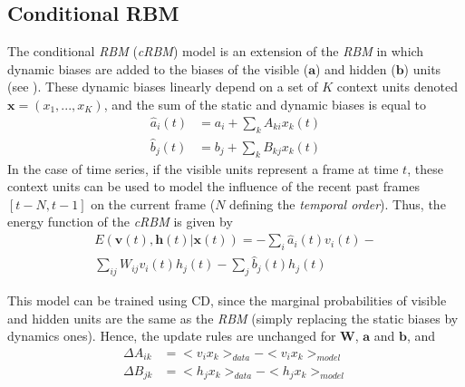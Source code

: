\documentclass[letterpaper]{article}
\begin{document}
\subsection{Conditional RBM}
The conditional \textit{RBM} (\textit{cRBM}) model \cite{taylor2009factored} is an extension of the \textit{RBM} in which dynamic biases are added to the biases of the visible ($\bm{a}$) and hidden ($\bm{b}$) units (see ). These dynamic biases linearly depend on a set of $K$ context units denoted $\bm{x} = (x_{1},...,x_{K})$, and the sum of the static and dynamic biases is equal to
\begin{align*}
\hat{a}_{i}(t) &= a_{i} + \sum_{k}A_{ki}x_{k}(t)\\
\hat{b}_{j}(t) &= b_{j} + \sum_{k}B_{kj}x_{k}(t)
\end{align*}
In the case of time series, if the visible units represent a frame at time $t$, these context units can be used to model the influence of the recent past frames $\left[ t-N, t-1 \right]$ on the current frame ($N$ defining the \textit{temporal order}).
Thus, the energy function of the \textit{cRBM} is given by
\begin{equation}
\begin{split}
\label{eq:energy_cRBM}
E(\bm{v}(t),\bm{h}(t)|\bm{x}(t)) =  - \sum_{i} \hat{a}_{i}(t)v_{i}(t) - \\ \sum_{ij}W_{ij}v_{i}(t)h_{j}(t) - \sum_{j} \hat{b}_{j}(t)h_{j}(t)
\end{split}
\end{equation}

This model can be trained using CD, since the marginal probabilities of visible and hidden units are the same as the \textit{RBM} (simply replacing the static biases by dynamics ones).
Hence, the update rules are unchanged for $\bm{W}$, $\bm{a}$ and $\bm{b}$, and
\begin{align}
\Delta A_{ik} 	&=<v_{i}x_{k} >_{data} - <v_{i}x_{k} >_{model}\\
\Delta B_{jk} 	&= <h_{j}x_{k} >_{data} - <h_{j}x_{k} >_{model}
\end{align}
\end{document}
